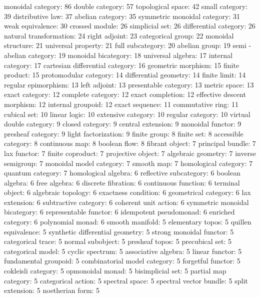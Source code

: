 monoidal category: 86
double category: 57
topological space: 42
small category: 39
distributive law: 37
abelian category: 35
symmetric monoidal category: 31
weak equivalence: 30
crossed module: 26
simplicial set: 26
differential category: 26
natural transformation: 24
right adjoint: 23
categorical group: 22
monoidal structure: 21
universal property: 21
full subcategory: 20
abelian group: 19
semi - abelian category: 19
monoidal bicategory: 18
universal algebra: 17
internal category: 17
cartesian differential category: 16
geometric morphism: 15
finite product: 15
protomodular category: 14
differential geometry: 14
finite limit: 14
regular epimorphism: 13
left adjoint: 13
presentable category: 13
metric space: 13
exact category: 12
complete category: 12
exact completion: 12
effective descent morphism: 12
internal groupoid: 12
exact sequence: 11
commutative ring: 11
cubical set: 10
linear logic: 10
extensive category: 10
regular category: 10
virtual double category: 9
closed category: 9
central extension: 9
monoidal functor: 9
presheaf category: 9
light factorization: 9
finite group: 8
finite set: 8
accessible category: 8
continuous map: 8
boolean flow: 8
fibrant object: 7
principal bundle: 7
lax functor: 7
finite coproduct: 7
projective object: 7
algebraic geometry: 7
inverse semigroup: 7
monoidal model category: 7
smooth map: 7
homological category: 7
quantum category: 7
homological algebra: 6
reflective subcategory: 6
boolean algebra: 6
free algebra: 6
discrete fibration: 6
continuous function: 6
terminal object: 6
algebraic topology: 6
exactness condition: 6
geometrical category: 6
lax extension: 6
subtractive category: 6
coherent unit action: 6
symmetric monoidal bicategory: 6
representable functor: 6
idempotent pseudomonad: 6
enriched category: 6
polynomial monad: 6
smooth manifold: 5
elementary topos: 5
quillen equivalence: 5
synthetic differential geometry: 5
strong monoidal functor: 5
categorical trace: 5
normal subobject: 5
presheaf topos: 5
precubical set: 5
categorical model: 5
cyclic spectrum: 5
associative algebra: 5
linear functor: 5
fundamental groupoid: 5
combinatorial model category: 5
forgetful functor: 5
cokleisli category: 5
opmonoidal monad: 5
bisimplicial set: 5
partial map category: 5
categorical action: 5
spectral space: 5
spectral vector bundle: 5
split extension: 5
noetherian form: 5